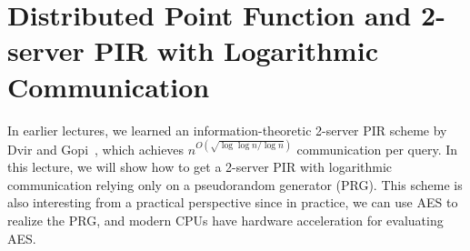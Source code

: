 
\newcommand{\PRF}{\ensuremath{{\sf PRF}}}
\newcommand{\FHE}{\ensuremath{{\sf FHE}}}
\newcommand{\Gen}{\ensuremath{{\sf Gen}}}
\newcommand{\Eval}{\ensuremath{{\sf Eval}}}
\newcommand{\DpfGen}{\ensuremath{{\sf DPF.Gen}}}
\newcommand{\DpfEval}{\ensuremath{{\sf DPF.Eval}}}
\newcommand{\Enc}{\ensuremath{{\sf Enc}}}
\newcommand{\Dec}{\ensuremath{{\sf Dec}}}
\newcommand{\Dpf}{\ensuremath{{\sf DPF}}}
\newcommand{\DPF}{\ensuremath{{\sf DPF}}}
\newcommand{\Prg}{\ensuremath{{\sf PRG}}}
\newcommand{\Pbc}{\ensuremath{{\sf PBC}}}
\newcommand{\Seed}{\ensuremath{{\sf Seed}}}
\newcommand{\DB}{\ensuremath{{\sf DB}}}
\newcommand{\Comm}{\ensuremath{{\sf Comm}}}
\newcommand{\GenSched}{\ensuremath{{\sf GenSchedule}}}
\newcommand{\ServerPre}{\ensuremath{{\sf ServerPreprocess}}}
\newcommand{\ClientQ}{\ensuremath{{\sf ClientQuery}}}
\newcommand{\ServerA}{\ensuremath{{\sf ServerAnswer}}}
\newcommand{\ClientD}{\ensuremath{{\sf ClientDecode}}}
\newtheorem{notation}{Notation}
\newcommand{\xor}{\ensuremath{\oplus}}
\newcommand{\Sim}{\ensuremath{{\sf Sim}}}
\newcommand{\negl}{\ensuremath{{\sf negl}}}
\newcommand{\get}{\ensuremath{\leftarrow}}
\newcommand{\Client}{\textsf{Client}~}
\newcommand{\Server}{\textsf{Server}~}
\newcommand{\CV}{\ensuremath{{\sf CV}}}
\newcommand{\key}{\ensuremath{{\sf key}}}
\newcommand{\getr}{\ensuremath{~{\overset{\$}{\leftarrow}}}~}
\newcommand{\ignore}[1]{}
\renewcommand{\root}{\ensuremath{{\sf root}}}

\newcommand{\elaine}[1]{{\color{red} [elaine: #1]}}
\newcommand{\mingxun}[1]{{\color{red} [mz: #1]}}

\section{Distributed Point Function and 2-server PIR with Logarithmic Communication} %

In earlier lectures, we learned an information-theoretic 2-server PIR
scheme 
by Dvir and Gopi~\cite{dvir20162}, which
achieves $n^{O(\sqrt{\log \log n / \log n})}$ communication per query. 
In this lecture, 
we will show how to get a 2-server PIR with logarithmic communication
relying only on a pseudorandom 
generator (PRG). This scheme is also interesting from a practical perspective
since in practice, we can use AES to realize
the PRG, and modern CPUs have hardware acceleration
for evaluating AES. 

